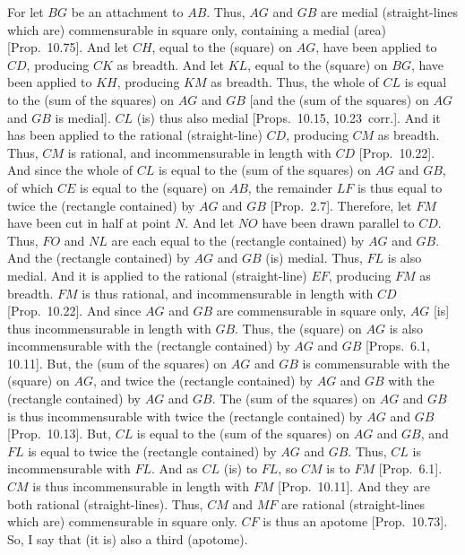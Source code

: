 For let $BG$ be an attachment to $AB$. Thus, $AG$ and $GB$ are medial
(straight-lines which are) commensurable in square only, containing
a medial (area) [Prop.~10.75]. And let $CH$,
equal to the (square) on $AG$, have been applied to $CD$, producing
$CK$ as breadth. And let $KL$, equal to the (square) on $BG$, have
been applied to $KH$, producing $KM$ as breadth. Thus, the whole
of $CL$ is equal to the (sum of the squares) on $AG$ and $GB$ [and
the (sum of the squares) on $AG$ and $GB$ is medial]. $CL$ (is) thus
also medial [Props.~10.15, 10.23~corr.]. And it has been applied to the rational (straight-line)
$CD$, producing $CM$ as breadth. Thus, $CM$ is rational, and
incommensurable in length with $CD$ [Prop.~10.22]. And since the whole of $CL$ is equal
to the (sum of the squares) on $AG$ and $GB$, of which $CE$ is
equal to the (square) on $AB$, the remainder $LF$ is thus equal to
twice the (rectangle contained) by $AG$ and $GB$ [Prop.~2.7]. Therefore, let $FM$ have been
cut in half at point $N$. And let $NO$ have been drawn parallel to $CD$.
Thus, $FO$ and $NL$ are each equal to the (rectangle contained) by
$AG$ and $GB$. And the (rectangle contained) by $AG$ and $GB$ (is)
medial. Thus, $FL$ is also medial. And it is applied to the
rational (straight-line) $EF$, producing $FM$ as breadth.
$FM$ is thus rational, and incommensurable in length with $CD$ [Prop.~10.22]. And since $AG$ and $GB$
are commensurable in square only, $AG$ [is] thus incommensurable
in length with $GB$. Thus, the (square) on $AG$ is also incommensurable
with the (rectangle contained) by $AG$ and $GB$
[Props.~6.1, 10.11]. But,  the (sum of the squares) on $AG$
and $GB$ is commensurable with the (square) on $AG$, and twice the
(rectangle contained) by $AG$ and $GB$ with the (rectangle contained)
by $AG$ and $GB$. The (sum of the squares) on $AG$ and $GB$
is thus incommensurable with twice the (rectangle contained)
by $AG$ and $GB$ [Prop.~10.13]. But,
$CL$ is equal to the (sum of the squares) on $AG$ and $GB$, 
and $FL$ is equal to twice the (rectangle contained) by $AG$ and $GB$. Thus,
$CL$ is incommensurable with $FL$. And as $CL$ (is) to $FL$, so
$CM$ is to $FM$ [Prop.~6.1].  $CM$ is thus
incommensurable in length with $FM$ [Prop.~10.11]. And they are both rational (straight-lines). Thus, $CM$ and $MF$ are rational (straight-lines which are)
commensurable in square only. $CF$ is thus an apotome [Prop.~10.73]. So, I say that (it is) also a
third (apotome).

